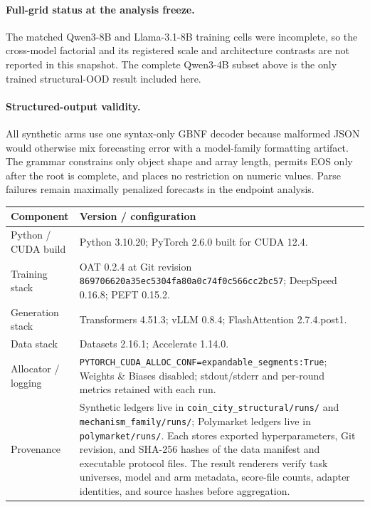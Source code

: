 \paragraph{Full-grid status at the analysis freeze.}
The matched Qwen3-8B and Llama-3.1-8B training cells were incomplete, so the
cross-model factorial and its registered scale and architecture contrasts are
not reported in this snapshot. The complete Qwen3-4B subset above is the only
trained structural-OOD result included here.


\paragraph{Structured-output validity.}
All synthetic arms use one syntax-only GBNF decoder because malformed JSON would
otherwise mix forecasting error with a model-family formatting artifact. The
grammar constrains only object shape and array length, permits EOS only after the
root is complete, and places no restriction on numeric values. Parse failures
remain maximally penalized forecasts in the endpoint analysis.


\begin{center}
\begin{minipage}{\linewidth}
\centering
{}
\label{tab:exp3-runtime}
\scriptsize
\setlength{\tabcolsep}{3pt}
\begin{tabular}{p{.29\linewidth}p{.66\linewidth}}
\toprule
\textbf{Component} & \textbf{Version / configuration} \\
\midrule
Python / CUDA build & Python 3.10.20; PyTorch 2.6.0 built for CUDA 12.4. \\
Training stack & OAT 0.2.4 at Git revision
\texttt{869706620a35ec5304fa80a0\allowbreak{}c74f0c566cc2bc57}; DeepSpeed 0.16.8; PEFT 0.15.2. \\
Generation stack & Transformers 4.51.3; vLLM 0.8.4; FlashAttention 2.7.4.post1. \\
Data stack & Datasets 2.16.1; Accelerate 1.14.0. \\
Allocator / logging & \texttt{PYTORCH\_CUDA\_ALLOC\_CONF=expandable\_segments:True};
Weights \& Biases disabled; stdout/stderr and per-round metrics retained with each
run. \\
Provenance & Synthetic ledgers live in
\texttt{coin\_city\_structural/runs/} and \texttt{mechanism\_family/runs/};
Polymarket ledgers live in \texttt{polymarket/runs/}. Each stores exported
hyperparameters, Git revision, and SHA-256 hashes of the data manifest and
executable protocol files. The result renderers verify task universes, model and
arm metadata, score-file counts, adapter identities, and source hashes before
aggregation. \\
\bottomrule
\end{tabular}
\end{minipage}
\end{center}
